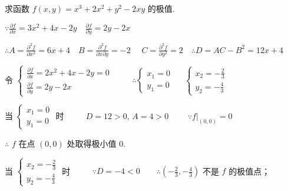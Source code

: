 \begin{problem}[points = 8]
求函数 $f(x, y) = x^3 + 2x^2 + y^2 -2xy$ 的极值.
\end{problem}
\begin{solution}
    $\because \frac{\partial f}{\partial x} = 3x^2 + 4x -2y \quad \frac{\partial f}{\partial y} = 2y - 2x$

    $\therefore A = \frac{\partial^2 f}{\partial x^2} = 6x + 4 \quad B = \frac{\partial^2 f}{\partial x\partial y} = -2 \quad$
    $C = \frac{\partial^2 f}{\partial y^2} = 2 \quad \therefore D = AC - B^2 = 12x + 4$

    令 $\begin{cases}
            \frac{\partial f}{\partial x} = 2x^2 + 4x -2y = 0 \\
            \frac{\partial f}{\partial y} = 2y - 2x
        \end{cases} \qquad$
    $\therefore \begin{cases}
            x_1 = 0 \\
            y_1 = 0
        \end{cases} \quad$
    $\begin{cases}
            x_2 = -\frac{2}{3} \\
            y_2 = -\frac{4}{3}
        \end{cases}$

    当 $\begin{cases}
            x_1 = 0 \\
            y_1 = 0
        \end{cases}$ 时 $\qquad$
    $D = 12 > 0,\, A = 4 > 0 \qquad$
    $\because f|_{(0, 0)} = 0$

    $\therefore$ $f$ 在点 $(0, 0)$ 处取得极小值 $0$.

    当 $\begin{cases}
            x_2 = -\frac{2}{3} \\
            y_2 = -\frac{4}{3}
        \end{cases}$ 时 $\qquad$
    $\because D = -4 < 0 \qquad \therefore (-\frac{2}{3}, -\frac{4}{3})$ 不是 $f$ 的极值点；
\end{solution}

